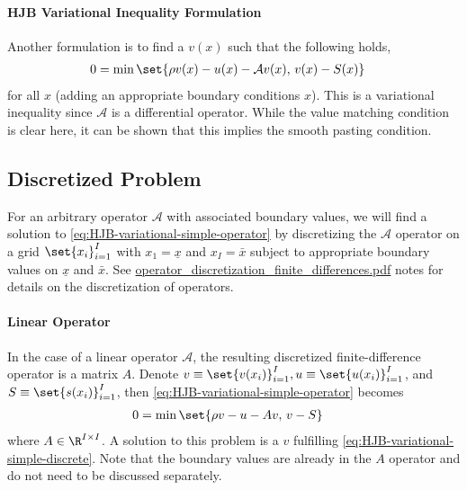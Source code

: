 \documentclass[11pt]{etk-article}
\begin{document}
\paragraph{HJB Variational Inequality Formulation}
Another formulation is to find a $v(x)$ such that the following holds,
\begin{align}
	0 &= \min\set{\rho v(x) - u(x) - \mathcal{A} v(x),\, v(x) - S(x) }\label{eq:HJB-variational-simple-operator}
\end{align}	
for all $x$ (adding an appropriate boundary conditions $x$).  This is a variational inequality since $\mathcal{A}$ is a differential operator.  While the value matching condition is clear here, it can be shown that this implies the smooth pasting condition.


\subsection{Discretized Problem}
For an arbitrary operator $\mathcal{A}$ with associated boundary values, we will find a solution to \cref{eq:HJB-variational-simple-operator} by discretizing the $\mathcal{A}$ operator on a grid $\set{x_i}_{i=1}^I$ with $x_1 = \underline{x}$ and $x_I = \bar{x}$ subject to appropriate boundary values on $\underline{x}$ and $\bar{x}$.  See \url{operator_discretization_finite_differences.pdf} notes for details on the discretization of operators.
\paragraph{Linear Operator}
In the case of a linear operator $\mathcal{A}$, the resulting discretized finite-difference operator is a matrix $A$.  Denote $v \equiv \set{v(x_i)}_{i=1}^I, u \equiv \set{u(x_i)}_{i=1}^I$, and $S \equiv \set{s(x_i)}_{i=1}^I$, then \cref{eq:HJB-variational-simple-operator} becomes
\begin{align}
	0 &= \min\set{\rho v - u - A v,\, v - S }\label{eq:HJB-variational-simple-discrete}
\end{align}
where $A\in\R^{I\times I}$.  A solution to this problem is a $v$ fulfilling \cref{eq:HJB-variational-simple-discrete}.  Note that the boundary values are already in the $A$ operator and do not need to be discussed separately.
\end{document}
